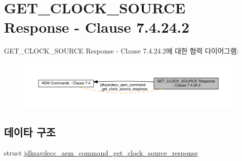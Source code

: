 \hypertarget{group__command__get__clock__source__response}{}\section{G\+E\+T\+\_\+\+C\+L\+O\+C\+K\+\_\+\+S\+O\+U\+R\+CE Response -\/ Clause 7.4.24.2}
\label{group__command__get__clock__source__response}
G\+E\+T\+\_\+\+C\+L\+O\+C\+K\+\_\+\+S\+O\+U\+R\+CE Response -\/ Clause 7.4.24.2에 대한 협력 다이어그램\+:
\nopagebreak
\begin{figure}[H]
\begin{center}
\leavevmode
\includegraphics[width=350pt]{group__command__get__clock__source__response}
\end{center}
\end{figure}
\subsection*{데이타 구조}
\begin{DoxyCompactItemize}
\item 
struct \hyperlink{structjdksavdecc__aem__command__get__clock__source__response}{jdksavdecc\+\_\+aem\+\_\+command\+\_\+get\+\_\+clock\+\_\+source\+\_\+response}
\end{DoxyCompactItemize}
